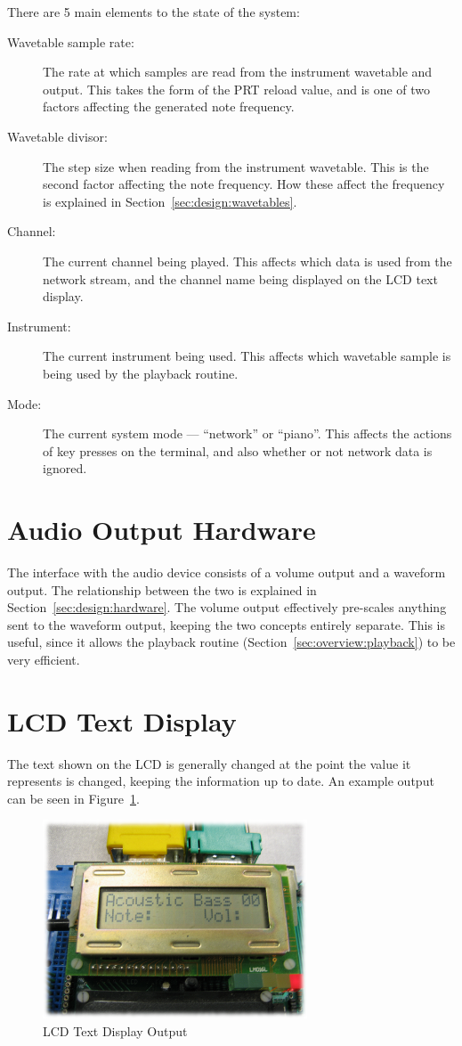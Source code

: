 There are 5 main elements to the state of the system:

\begin{description}
\item[Wavetable sample rate:] The rate at which samples are read from the instrument wavetable and 
output.  This takes the form of the PRT reload value, and is one of two factors affecting the 
generated note frequency.
\item[Wavetable divisor:] The step size when reading from the instrument wavetable.  This is the 
second factor affecting the note frequency.  How these affect the frequency is explained in 
Section~\ref{sec:design:wavetables}.
\item[Channel:] The current channel being played.  This affects which data is used from the network 
stream, and the channel name being displayed on the LCD text display.
\item[Instrument:] The current instrument being used.  This affects which wavetable sample is being 
used by the playback routine.
\item[Mode:] The current system mode --- ``network'' or ``piano''.  This affects the actions of key 
presses on the terminal, and also whether or not network data is ignored.
\end{description}

\section{Audio Output Hardware}
\label{sec:overview:hardware}

The interface with the audio device consists of a volume output and a waveform output.  The 
relationship between the two is explained in Section~\ref{sec:design:hardware}.  The volume output 
effectively pre-scales anything sent to the waveform output, keeping the two concepts entirely 
separate.  This is useful, since it allows the playback routine 
(Section~\ref{sec:overview:playback}) to be very efficient.

\section{LCD Text Display}
\label{sec:overview:lcd}

The text shown on the LCD is generally changed at the point the value it represents is changed, 
keeping the information up to date.  An example output can be seen in Figure~\ref{fig:lcd}.

\begin{figure}[htb]
\centering
\includegraphics[width=0.7\textwidth]{images/lcd}
\caption{LCD Text Display Output}\label{fig:lcd}
\end{figure}
